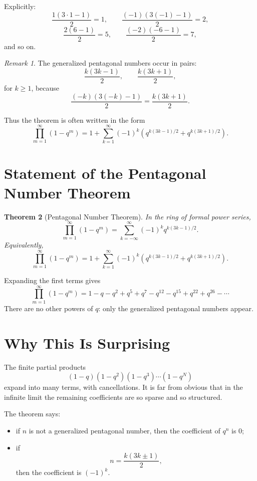 \documentclass[11pt]{article}
\newtheorem{theorem}{Theorem}[section]
\theoremstyle{definition}
\theoremstyle{remark}
\newtheorem{remark}[theorem]{Remark}
\begin{document}
	Explicitly:
	\[
	\frac{1(3\cdot 1-1)}{2}=1,\qquad
	\frac{(-1)(3(-1)-1)}{2}=2,
	\]
	\[
	\frac{2(6-1)}{2}=5,\qquad
	\frac{(-2)(-6-1)}{2}=7,
	\]
	and so on.
	
	\begin{remark}
		The generalized pentagonal numbers occur in pairs:
		\[
		\frac{k(3k-1)}{2},\qquad \frac{k(3k+1)}{2},
		\]
		for \(k\ge 1\), because
		\[
		\frac{(-k)(3(-k)-1)}{2}=\frac{k(3k+1)}{2}.
		\]
	\end{remark}
	
	Thus the theorem is often written in the form
	\[
	\prod_{m=1}^{\infty}(1-q^m)
	=
	1+\sum_{k=1}^{\infty}(-1)^k
	\left(q^{k(3k-1)/2}+q^{k(3k+1)/2}\right).
	\]
	
	\section{Statement of the Pentagonal Number Theorem}
	
	\begin{theorem}[Pentagonal Number Theorem]
		In the ring of formal power series,
		\[
		\prod_{m=1}^{\infty}(1-q^m)
		=
		\sum_{k=-\infty}^{\infty}(-1)^k q^{k(3k-1)/2}.
		\]
		Equivalently,
		\[
		\prod_{m=1}^{\infty}(1-q^m)
		=
		1+\sum_{k=1}^{\infty}(-1)^k
		\left(q^{k(3k-1)/2}+q^{k(3k+1)/2}\right).
		\]
	\end{theorem}
	
	Expanding the first terms gives
	\[
	\prod_{m=1}^{\infty}(1-q^m)
	=
	1-q-q^2+q^5+q^7-q^{12}-q^{15}+q^{22}+q^{26}-\cdots
	\]
	There are no other powers of \(q\): only the generalized pentagonal numbers appear.
	
	\section{Why This Is Surprising}
	
	The finite partial products
	\[
	(1-q)(1-q^2)(1-q^3)\cdots(1-q^N)
	\]
	expand into many terms, with cancellations. It is far from obvious that in the infinite limit the remaining coefficients are so sparse and so structured.
	
	The theorem says:
	\begin{itemize}
		\item if \(n\) is not a generalized pentagonal number, then the coefficient of \(q^n\) is \(0\);
		\item if
		\[
		n=\frac{k(3k\pm 1)}{2},
		\]
		then the coefficient is \((-1)^k\).
	\end{itemize}
	
\end{document}
